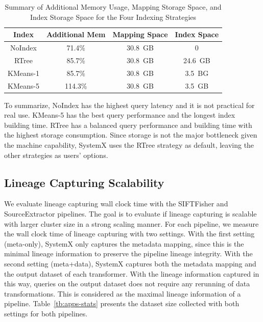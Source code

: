 \documentclass{sig-alternate}
\begin{document}
\begin{table}[t]
\begin{center}
    \caption{Summary of Additional Memory Usage, Mapping Storage Space, and Index Storage Space for the Four Indexing Strategies}
    \begin{scriptsize}
    \begin{tabular}{ | c | c | c | c |}
    \hline
    Index & Additional  Mem & Mapping Space & Index Space \\ \hline \hline
    NoIndex & 71.4\% & 30.8~GB & 0 \\ \hline
    RTree & 85.7\% & 30.8~GB & 24.6~GB\\ \hline
    KMeans-1 & 85.7\% & 30.8~GB & 3.5~BG\\ \hline
    KMeans-5 & 114.3\% & 30.8~GB & 3.5~GB\\ \hline
    \end{tabular}
    \end{scriptsize}
    \label{tb:sift-index-resource}
\end{center}   
\end{table}


To summarize, NoIndex has the highest query latency and it is not practical for real use.
KMeans-5 has the best query performance and the longest index building time.
RTree has a balanced query performance and building time with the highest storage consumption.
Since storage is not the major bottleneck given the machine capability, SystemX uses the RTree strategy
as default, leaving the other strategies as users' options.


\subsection{Lineage Capturing Scalability}
We evaluate lineage capturing wall clock time with the SIFTFisher and SourceExtractor pipelines. 
The goal is to evaluate if lineage capturing is scalable with larger cluster size in a strong scaling manner.
For each pipeline, we measure the wall clock time of lineage capturing with two settings.
With the first setting (meta-only), SystemX only captures the metadata mapping, since this is the minimal lineage information 
to preserve the pipeline lineage integrity.
With the second setting (meta+data), SystemX captures both the metadata mapping and the output dataset of each transformer.
With the lineage information captured in this way, queries on the output dataset does not require any rerunning of data transformations.
This is considered as the maximal lineage information of a pipeline. 
Table~\ref{tb:apps-stats} presents the dataset size collected with both settings for both pipelines.
\end{document}
